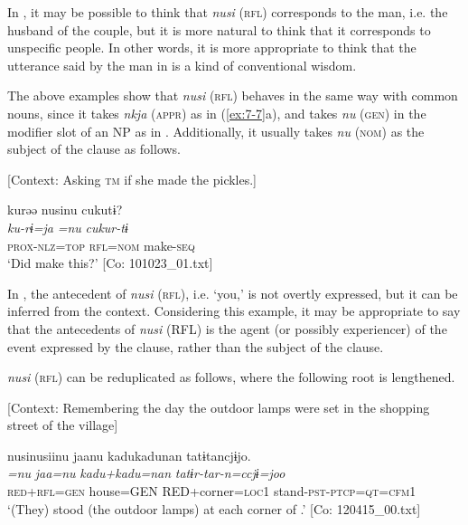 \z

In , it may be possible to think that \textit{nusi} (\textsc{rfl}) corresponds to the man, i.e. the husband of the couple, but it is more natural to think that it corresponds to unspecific people. In other words, it is more appropriate to think that the utterance said by the man in  is a kind of conventional wisdom.

  The above examples show that \textit{nusi} (\textsc{rfl}) behaves in the same way with common nouns, since it takes \textit{nkja} (\textsc{appr}) as in (\ref{ex:7-7}a), and takes \textit{nu} (\textsc{gen}) in the modifier slot of an NP as in . Additionally, it usually takes \textit{nu} (\textsc{nom}) as the subject of the clause as follows.

\ea \label{ex:7:9}  [Context: Asking \textsc{tm} if she made the pickles.]

{\MY}
\glll  kurəə  nusinu  cukutɨ?\\
    \textit{ku-rɨ=ja}  \textit{=nu}  \textit{cukur-tɨ}\\
    \textsc{prox}-\textsc{nlz}=\textsc{top}  \textsc{rfl}=\textsc{nom}  make-\textsc{seq}\\
    \glt [lit.] ‘Did  make this?’ [Co: 101023\_01.txt]

\z

In , the antecedent of \textit{nusi} (\textsc{rfl}), i.e. ‘you,’ is not overtly expressed, but it can be inferred from the context. Considering this example, it may be appropriate to say that the antecedents of \textit{nusi} (RFL) is the agent (or possibly experiencer) of the event expressed by the clause, rather than the subject of the clause.

\textit{nusi} (\textsc{rfl}) can be reduplicated as follows, where the following root is lengthened.

\ea \label{ex:7:10}  [Context: Remembering the day the outdoor lamps were set in the shopping street of the village]

{\TM}
\glll  nusinusiinu  jaanu  kadukadunan  tatɨtancjɨjo.\\
\textit{=nu}  \textit{jaa=nu}  \textit{kadu+kadu=nan}  \textit{tatɨr-tar-n=ccjɨ=joo}\\
\textsc{red}+\textsc{rfl}=\textsc{gen}  house=GEN  RED+corner=\textsc{loc}1  stand-\textsc{pst}-\textsc{ptcp}=\textsc{qt}=\textsc{cfm}1\\
\glt ‘(They) stood (the outdoor lamps) at each corner of .’ [Co: 120415\_00.txt]

